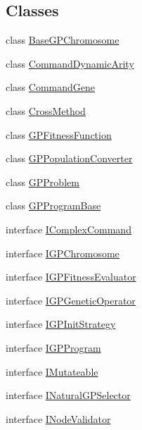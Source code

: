 \subsection*{Classes}
\begin{DoxyCompactItemize}
\item 
class \hyperlink{classorg_1_1jgap_1_1gp_1_1_base_g_p_chromosome}{Base\-G\-P\-Chromosome}
\item 
class \hyperlink{classorg_1_1jgap_1_1gp_1_1_command_dynamic_arity}{Command\-Dynamic\-Arity}
\item 
class \hyperlink{classorg_1_1jgap_1_1gp_1_1_command_gene}{Command\-Gene}
\item 
class \hyperlink{classorg_1_1jgap_1_1gp_1_1_cross_method}{Cross\-Method}
\item 
class \hyperlink{classorg_1_1jgap_1_1gp_1_1_g_p_fitness_function}{G\-P\-Fitness\-Function}
\item 
class \hyperlink{classorg_1_1jgap_1_1gp_1_1_g_p_population_converter}{G\-P\-Population\-Converter}
\item 
class \hyperlink{classorg_1_1jgap_1_1gp_1_1_g_p_problem}{G\-P\-Problem}
\item 
class \hyperlink{classorg_1_1jgap_1_1gp_1_1_g_p_program_base}{G\-P\-Program\-Base}
\item 
interface \hyperlink{interfaceorg_1_1jgap_1_1gp_1_1_i_complex_command}{I\-Complex\-Command}
\item 
interface \hyperlink{interfaceorg_1_1jgap_1_1gp_1_1_i_g_p_chromosome}{I\-G\-P\-Chromosome}
\item 
interface \hyperlink{interfaceorg_1_1jgap_1_1gp_1_1_i_g_p_fitness_evaluator}{I\-G\-P\-Fitness\-Evaluator}
\item 
interface \hyperlink{interfaceorg_1_1jgap_1_1gp_1_1_i_g_p_genetic_operator}{I\-G\-P\-Genetic\-Operator}
\item 
interface \hyperlink{interfaceorg_1_1jgap_1_1gp_1_1_i_g_p_init_strategy}{I\-G\-P\-Init\-Strategy}
\item 
interface \hyperlink{interfaceorg_1_1jgap_1_1gp_1_1_i_g_p_program}{I\-G\-P\-Program}
\item 
interface \hyperlink{interfaceorg_1_1jgap_1_1gp_1_1_i_mutateable}{I\-Mutateable}
\item 
interface \hyperlink{interfaceorg_1_1jgap_1_1gp_1_1_i_natural_g_p_selector}{I\-Natural\-G\-P\-Selector}
\item 
interface \hyperlink{interfaceorg_1_1jgap_1_1gp_1_1_i_node_validator}{I\-Node\-Validator}
\item 

\end{DoxyCompactItemize}
